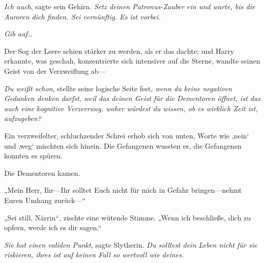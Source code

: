 \emph{Ich auch}, sagte sein Gehirn. \emph{Setz deinen Patronus-Zauber ein und warte, bis die Auroren dich finden. Sei vernünftig. Es ist vorbei.}

\emph{Gib auf…}

Der Sog der Leere schien stärker zu werden, als er das dachte; und Harry erkannte, was geschah, konzentrierte sich intensiver auf die Sterne, wandte seinen Geist von der Verzweiflung ab—

\emph{Du weißt schon}, stellte seine logische Seite fest, \emph{wenn du keine negativen Gedanken denken darfst, weil das deinen Geist für die Dementoren öffnet, ist das auch eine kognitive Verzerrung, woher würdest du wissen, ob es wirklich Zeit \emph{ist}, aufzugeben?}

Ein verzweifelter, schluchzender Schrei erhob sich von unten, Worte wie ‚nein‘ und ‚weg‘ mischten sich hinein. Die Gefangenen wussten es, die Gefangenen konnten es spüren.

Die Dementoren kamen.

„Mein Herr, Ihr—Ihr solltet Euch nicht für mich in Gefahr bringen—nehmt Euren Umhang zurück—“

„Sei still, Närrin“, zischte eine wütende Stimme.
„Wenn ich beschließe, dich zu opfern, werde ich es dir sagen.“

\emph{Sie hat einen validen Punkt}, sagte Slytherin. \emph{Du solltest dein Leben nicht für sie riskieren, ihres ist auf keinen Fall so wertvoll wie deines.}

